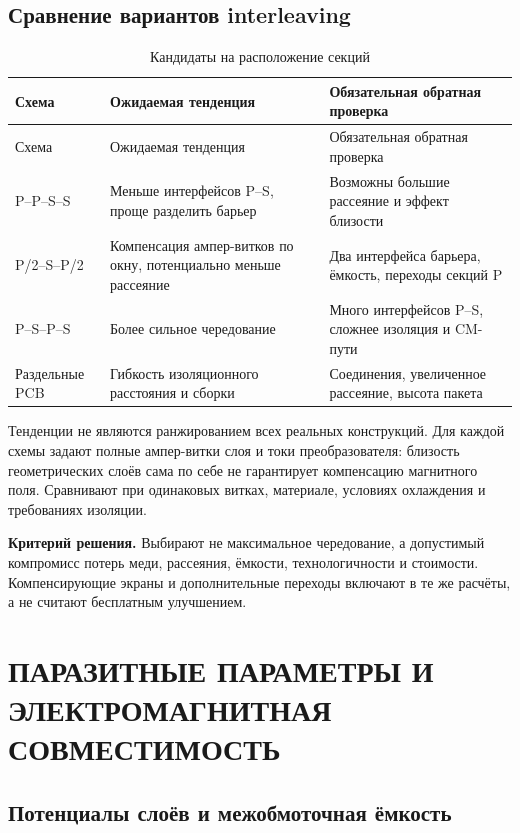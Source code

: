 \documentclass[14pt,a4paper]{extarticle}
\newcommand{\criterion}{\par\noindent\textbf{Критерий решения.} }
\begin{document}
\subsection{Сравнение вариантов interleaving}
\begin{longtable}{>{\raggedright\arraybackslash}p{30mm}>{\raggedright\arraybackslash}p{62mm}>{\raggedright\arraybackslash}p{62mm}}
\caption{Кандидаты на расположение секций}\label{pl:interleave}\\
\toprule Схема & Ожидаемая тенденция & Обязательная обратная проверка\\\midrule\endfirsthead
\toprule Схема & Ожидаемая тенденция & Обязательная обратная проверка\\\midrule\endhead
P--P--S--S & Меньше интерфейсов P--S, проще разделить барьер & Возможны большие рассеяние и эффект близости\\
P/2--S--P/2 & Компенсация ампер-витков по окну, потенциально меньше рассеяние & Два интерфейса барьера, ёмкость, переходы секций P\\
P--S--P--S & Более сильное чередование & Много интерфейсов P--S, сложнее изоляция и CM-пути\\
Раздельные PCB & Гибкость изоляционного расстояния и сборки & Соединения, увеличенное рассеяние, высота пакета\\
\bottomrule
\end{longtable}
Тенденции не являются ранжированием всех реальных конструкций. Для каждой схемы задают полные ампер-витки слоя и токи преобразователя: близость геометрических слоёв сама по себе не гарантирует компенсацию магнитного поля. Сравнивают при одинаковых витках, материале, условиях охлаждения и требованиях изоляции.\cite{web1,web2}

\criterion Выбирают не максимальное чередование, а допустимый компромисс потерь меди, рассеяния, ёмкости, технологичности и стоимости. Компенсирующие экраны и дополнительные переходы включают в те же расчёты, а не считают бесплатным улучшением.

\section{ПАРАЗИТНЫЕ ПАРАМЕТРЫ И ЭЛЕКТРОМАГНИТНАЯ СОВМЕСТИМОСТЬ}
\label{pl:parasitics}
\subsection{Потенциалы слоёв и межобмоточная ёмкость}
\end{document}
